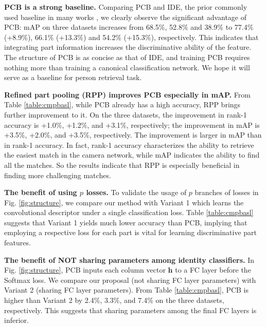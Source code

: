 \documentclass[10pt,twocolumn,letterpaper]{article}
\begin{document}
\textbf{PCB is a strong baseline.}
Comparing PCB and IDE, the prior commonly used baseline in many works \cite{DBLP:journals/corr/ZhengYH16,DBLP:journals/corr/ZhengHLY17,DBLP:conf/cvpr/XiaoLOW16,geng2016deep,Sun2017SVDNet,Zheng2017PAN,zheng2017unlabeled,Zhong2017Random},
we clearly observe the significant advantage of PCB: mAP on three datasets increases from 68.5\%, 52.8\% and 38.9\% to 77.4\% (+8.9\%), 66.1\% (+13.3\%) and 54.2\% (+15.3\%), respectively. This indicates that integrating part information increases the discriminative ability of the feature. The structure of PCB is as concise as that of IDE, and training PCB requires nothing more than training a canonical classification network. We hope it will serve as a baseline for person retrieval task.

\textbf{Refined part pooling (RPP) improves PCB especially in mAP.} From Table \ref{table:cmpbasl}, while PCB already has a high accuracy, RPP brings further improvement to it. On the three datasets, the improvement in rank-1 accuracy is +1.0\%, +1.2\%, and +3.1\%, respectively; the improvement in mAP is +3.5\%, +2.0\%, and +3.5\%, respectively. The improvement is larger in mAP than in rank-1 accuracy. In fact, rank-1 accuracy characterizes the ability to retrieve the easiest match in the camera network, while mAP indicates the ability to find all the matches. So the results indicate that RPP is especially beneficial in finding more challenging matches. 

\textbf{The benefit of using $p$ losses.} To validate the usage of $p$ branches of losses in Fig. \ref{fig:structure}, we compare our method with Variant 1 which learns the convolutional descriptor under a single classification loss. Table \ref{table:cmpbasl} suggests that Variant 1 yields much lower accuracy than PCB, implying that employing a respective loss for each part is vital for learning discriminative part features. 

\textbf{The benefit of NOT sharing parameters among identity classifiers.} In Fig. \ref{fig:structure}, PCB inputs each column vector $\bm h$ to a FC layer before the Softmax loss. We compare our proposal (not sharing FC layer parameters) with Variant 2 (sharing FC layer parameters). From Table \ref{table:cmpbasl}, PCB is higher than Variant 2 by 2.4\%, 3.3\%, and 7.4\% on the three datasets, respectively. This suggests that sharing parameters among the final FC layers is inferior.
\end{document}
